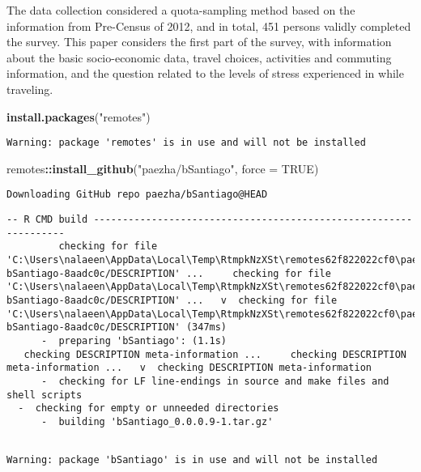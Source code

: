 \documentclass[
11pt, %
oneside, %
english, %
singlespacing, %
]{macthesis} %
\newenvironment{Shaded}{\begin{snugshade}}{\end{snugshade}}
\newcommand{\AttributeTok}[1]{\textcolor[rgb]{0.13,0.29,0.53}{#1}}
\newcommand{\ConstantTok}[1]{\textcolor[rgb]{0.56,0.35,0.01}{#1}}
\newcommand{\FunctionTok}[1]{\textcolor[rgb]{0.13,0.29,0.53}{\textbf{#1}}}
\newcommand{\NormalTok}[1]{#1}
\newcommand{\SpecialCharTok}[1]{\textcolor[rgb]{0.81,0.36,0.00}{\textbf{#1}}}
\newcommand{\StringTok}[1]{\textcolor[rgb]{0.31,0.60,0.02}{#1}}
\begin{document}
The data collection considered a quota-sampling method based on the information from Pre-Census of 2012, and in total, 451 persons validly completed the survey. This paper considers the first part of the survey, with information about the basic socio-economic data, travel choices, activities and commuting information, and the question related to the levels of stress experienced in while traveling.
\begin{Shaded}
\begin{Highlighting}[]
\FunctionTok{install.packages}\NormalTok{(}\StringTok{"remotes"}\NormalTok{)}
\end{Highlighting}
\end{Shaded}
\begin{verbatim}
Warning: package 'remotes' is in use and will not be installed
\end{verbatim}
\begin{Shaded}
\begin{Highlighting}[]
\NormalTok{remotes}\SpecialCharTok{::}\FunctionTok{install\_github}\NormalTok{(}\StringTok{"paezha/bSantiago"}\NormalTok{, }\AttributeTok{force =} \ConstantTok{TRUE}\NormalTok{)}
\end{Highlighting}
\end{Shaded}
\begin{verbatim}
Downloading GitHub repo paezha/bSantiago@HEAD
\end{verbatim}
\begin{verbatim}
-- R CMD build -----------------------------------------------------------------
         checking for file 'C:\Users\nalaeen\AppData\Local\Temp\RtmpkNzXSt\remotes62f822022cf0\paezha-bSantiago-8aadc0c/DESCRIPTION' ...     checking for file 'C:\Users\nalaeen\AppData\Local\Temp\RtmpkNzXSt\remotes62f822022cf0\paezha-bSantiago-8aadc0c/DESCRIPTION' ...   v  checking for file 'C:\Users\nalaeen\AppData\Local\Temp\RtmpkNzXSt\remotes62f822022cf0\paezha-bSantiago-8aadc0c/DESCRIPTION' (347ms)
      -  preparing 'bSantiago': (1.1s)
   checking DESCRIPTION meta-information ...     checking DESCRIPTION meta-information ...   v  checking DESCRIPTION meta-information
      -  checking for LF line-endings in source and make files and shell scripts
  -  checking for empty or unneeded directories
      -  building 'bSantiago_0.0.0.9-1.tar.gz'
     
\end{verbatim}
\begin{verbatim}
Warning: package 'bSantiago' is in use and will not be installed
\end{verbatim}
\end{document}
